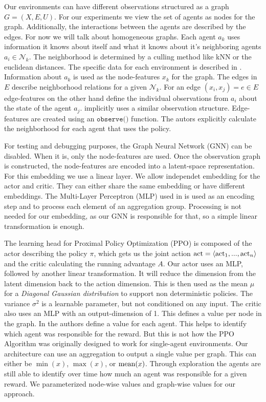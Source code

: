 Our environments can have different observations structured as a graph $G = (X,E,U)$. For our experiments we view the set of agents as nodes for the graph. Additionally, the interactions between the agents are described by the edges. For now we will talk about homogeneous graphs. Each agent $a_k$ uses information it knows about itself and what it knows about it's neighboring agents $a_i \in \mathcal{N}_k$. The neighborhood is determined by a culling method like kNN or the euclidean distances. The specific data for each environment is described in . Information about $a_k$ is used as the node-features $x_k$ for the graph. The edges in $E$ describe neighborhood relations for a given $\mathcal{N}_k$. For an edge $(x_i,x_j) = e \in E$ edge-features on the other hand define the individual observations from $a_i$ about the state of the agent $a_j$.  implicitly uses a similar observation structure. Edge-features are created using an $\texttt{observe()}$ function. The autors explicitly calculate the neighborhood for each agent that uses the policy. \par

For testing and debugging purposes, the Graph Neural Network (GNN) can be disabled. When it is, only the node-features are used. Once the observation graph is constructed, the node-features are encoded into a latent-space representation. For this embedding we use a linear layer. We allow independet embedding for the actor and critic. They can either share the same embedding or have different embeddings. The Multi-Layer Perceptron (MLP) used in  is used as an encoding step and to process each element of an aggregation group. Processing is not needed for our embedding, as our GNN is responsible for that, so a simple linear transformation is enough.\par

The learning head for Proximal Policy Optimization (PPO) is composed of the actor describing the policy $\pi$, which gets us the joint action $\textup{act} = \langle \textup{act}_1,...,\textup{act}_n \rangle$ and the critic calculating the running advantage $A$. Our actor uses an MLP, followed by another linear transformation. It will reduce the dimension from the latent dimension back to the action dimension. This is then used as the mean $\mu$ for a \emph{Diagonal Gaussian distribution} to support non deterministic policies. The variance $\sigma^2$ is a learnable parameter, but not conditioned on any input. The critic also uses an MLP with an output-dimension of 1. This defines a value per node in the graph. In  the authors define a value for each agent. This helps to identify which agent was responsible for the reward. But this is not how the PPO Algorithm was originally designed to work for single-agent environments. Our architecture can use an aggregation to output a single value per graph. This can either be $\min(x)$, $\max(x)$, or $\textup{mean}(x)$. Through exploration the agents are still able to identify over time how much an agent was responsible for a given reward. We parameterized node-wise values and graph-wise values for our approach. \par



